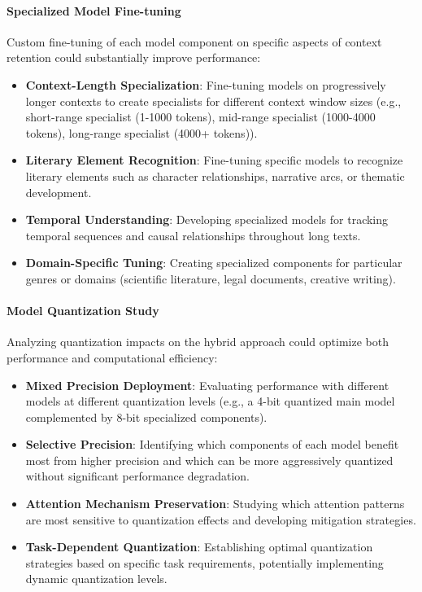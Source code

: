 \documentclass[conference]{IEEEtran}
\begin{document}
\paragraph{Specialized Model Fine-tuning}
Custom fine-tuning of each model component on specific aspects of context retention could substantially improve performance:
\begin{itemize}
    \item \textbf{Context-Length Specialization}: Fine-tuning models on progressively longer contexts to create specialists for different context window sizes (e.g., short-range specialist (1-1000 tokens), mid-range specialist (1000-4000 tokens), long-range specialist (4000+ tokens)).
    \item \textbf{Literary Element Recognition}: Fine-tuning specific models to recognize literary elements such as character relationships, narrative arcs, or thematic development.
    \item \textbf{Temporal Understanding}: Developing specialized models for tracking temporal sequences and causal relationships throughout long texts.
    \item \textbf{Domain-Specific Tuning}: Creating specialized components for particular genres or domains (scientific literature, legal documents, creative writing).
\end{itemize}

\paragraph{Model Quantization Study}
Analyzing quantization impacts on the hybrid approach could optimize both performance and computational efficiency:
\begin{itemize}
    \item \textbf{Mixed Precision Deployment}: Evaluating performance with different models at different quantization levels (e.g., a 4-bit quantized main model complemented by 8-bit specialized components).
    \item \textbf{Selective Precision}: Identifying which components of each model benefit most from higher precision and which can be more aggressively quantized without significant performance degradation.
    \item \textbf{Attention Mechanism Preservation}: Studying which attention patterns are most sensitive to quantization effects and developing mitigation strategies.
    \item \textbf{Task-Dependent Quantization}: Establishing optimal quantization strategies based on specific task requirements, potentially implementing dynamic quantization levels.
\end{itemize}
\end{document}
